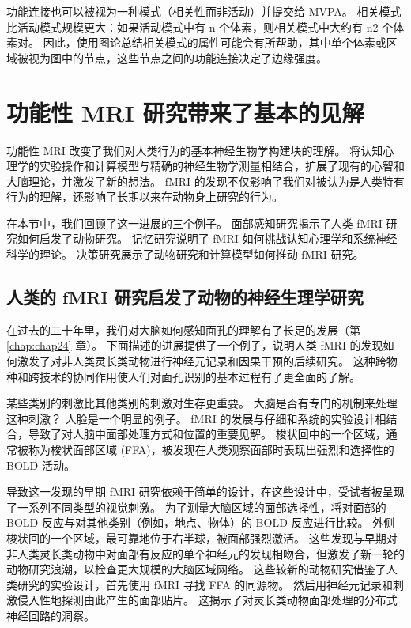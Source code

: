 功能连接也可以被视为一种模式（相关性而非活动）并提交给 MVPA。 
相关模式比活动模式规模更大：如果活动模式中有 n 个体素，则相关模式中大约有 n2 个体素对。 
因此，使用图论总结相关模式的属性可能会有所帮助，其中单个体素或区域被视为图中的节点，这些节点之间的功能连接决定了边缘强度。



\section{功能性 MRI 研究带来了基本的见解}
功能性 MRI 改变了我们对人类行为的基本神经生物学构建块的理解。 
将认知心理学的实验操作和计算模型与精确的神经生物学测量相结合，扩展了现有的心智和大脑理论，并激发了新的想法。 
fMRI 的发现不仅影响了我们对被认为是人类特有行为的理解，还影响了长期以来在动物身上研究的行为。


在本节中，我们回顾了这一进展的三个例子。 
面部感知研究揭示了人类 fMRI 研究如何启发了动物研究。 
记忆研究说明了 fMRI 如何挑战认知心理学和系统神经科学的理论。 
决策研究展示了动物研究和计算模型如何推动 fMRI 研究。


\subsection{人类的 fMRI 研究启发了动物的神经生理学研究}
在过去的二十年里，我们对大脑如何感知面孔的理解有了长足的发展（第 \ref{chap:chap24} 章）。 
下面描述的进展提供了一个例子，说明人类 fMRI 的发现如何激发了对非人类灵长类动物进行神经元记录和因果干预的后续研究。 
这种跨物种和跨技术的协同作用使人们对面孔识别的基本过程有了更全面的了解。


某些类别的刺激比其他类别的刺激对生存更重要。 
大脑是否有专门的机制来处理这种刺激？ 
人脸是一个明显的例子。 
fMRI 的发展与仔细和系统的实验设计相结合，导致了对人脑中面部处理方式和位置的重要见解。 
梭状回中的一个区域，通常被称为梭状面部区域 (FFA)，被发现在人类观察面部时表现出强烈和选择性的 BOLD 活动。


导致这一发现的早期 fMRI 研究依赖于简单的设计，在这些设计中，受试者被呈现了一系列不同类型的视觉刺激。 
为了测量大脑区域的面部选择性，将对面部的 BOLD 反应与对其他类别（例如，地点、物体）的 BOLD 反应进行比较。 
外侧梭状回的一个区域，最可靠地位于右半球，被面部强烈激活。 
这些发现与早期对非人类灵长类动物中对面部有反应的单个神经元的发现相吻合，但激发了新一轮的动物研究浪潮，以检查更大规模的大脑区域网络。 
这些较新的动物研究借鉴了人类研究的实验设计，首先使用 fMRI 寻找 FFA 的同源物。 
然后用神经元记录和刺激侵入性地探测由此产生的面部贴片。 
这揭示了对灵长类动物面部处理的分布式神经回路的洞察。


